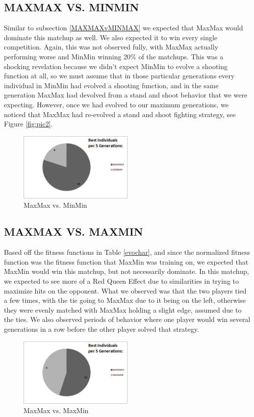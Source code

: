 \documentclass{acm_proc_article-sp}
\begin{document}
\subsection{MAXMAX VS. MINMIN}
\label{MAXMAXvMINMIN}
Similar to subsection \ref{MAXMAXvMINMAX} we expected that MaxMax would dominate this matchup as well. We also expected it to win every single competition. Again, this was not observed fully, with MaxMax actually performing worse and MinMin winning 20\% of the matchups. This was a shocking revelation because we didn't expect MinMin to evolve a shooting function at all, so we must assume that in those particular generations every individual in MinMin had evolved a shooting function, and in the same generation MaxMax had devolved from a stand and shoot behavior that we were expecting. However, once we had evolved to our maximum generations, we noticed that MaxMax had re-evolved a stand and shoot fighting strategy, see Figure \ref{fig:pic2}.
\begin{figure}[h]
\centering
\caption{MaxMax vs. MinMin}
\label{fig:MaxMaxMinMin}
\includegraphics[width=0.5\textwidth]{MaxMaxvMinMin}
\end{figure}

\subsection{MAXMAX VS. MAXMIN}
\label{MAXMAXvMAXMIN}
Based off the fitness functions in Table \ref{evochar}, and since the normalized fitness function was the fitness function that MaxMin was training on, we expected that MaxMin would win this matchup, but not necessarily dominate. In this matchup, we expected to see more of a Red Queen Effect due to similarities in trying to maximize hits on the opponent. What we observed was that the two players tied a few times, with the tie going to MaxMax due to it being on the left, otherwise they were evenly matched with MaxMax holding a slight edge, assumed due to the ties. We also observed periods of behavior where one player would win several generations in a row before the other player solved that strategy.
\begin{figure}[h]
\centering
\caption{MaxMax vs. MaxMin}
\label{fig:MaxMaxMaxMin}
\includegraphics[width=0.5\textwidth]{MaxMaxvMaxMin}
\end{figure}
\end{document}
